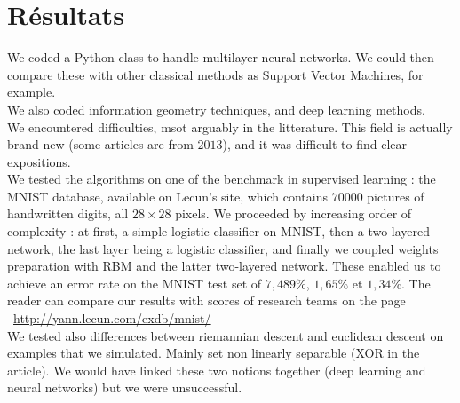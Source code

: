 \documentclass{article}
\begin{document}
\section{Résultats}

We coded a Python class to handle multilayer neural networks. We could then compare these with other classical methods as Support Vector Machines, for example.\\

We also coded information geometry techniques, and deep learning methods.\\

We encountered difficulties, msot arguably in the litterature. This field is actually brand new (some articles are from $2013$), and it was difficult to find clear expositions.\\

We tested the algorithms on one of the benchmark in supervised learning : the MNIST database, available on Lecun's site, which contains $70 000$ pictures of handwritten digits, all $28 \times 28$ pixels. We proceeded by increasing order of complexity : at first, a simple logistic classifier on MNIST, then a two-layered network, the last layer being a logistic classifier, and finally we coupled weights preparation with RBM and the latter two-layered network. These enabled us to achieve an error rate on the MNIST test set of $7,489\%$, $1,65\%$ et $1,34\%$. The reader can compare our results with scores of research teams on the page  ~\url{http://yann.lecun.com/exdb/mnist/}\\

We tested also differences between riemannian descent and euclidean descent on examples that we simulated. Mainly set non linearly separable (XOR in the article). We would have linked these two notions together (deep learning and neural networks) but we were unsuccessful.



 
\nocite{*}
\end{document}
